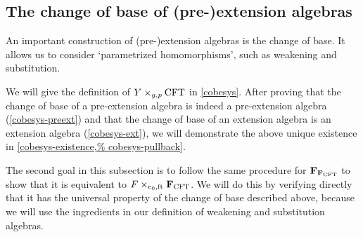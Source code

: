 \subsection{The change of base of (pre-)extension algebras}
\label{subsection:change_of_base}
An important construction of (pre-)extension algebras is the change of base. It
allows us to consider `parametrized homomorphisms', such as weakening and
substitution.

We will
give the definition of $\cobesys{Y}{\stesys}{g}{p}$ in \autoref{cobesys}. After
proving that the change of base of a pre-extension algebra is indeed a
pre-extension algebra (\autoref{cobesys-preext}) and that the change of base
of an extension algebra is an extension algebra (\autoref{cobesys-ext}), we
will demonstrate the above unique existence in \autoref{cobesys-existence,%
cobesys-pullback}.

The second goal in this subsection is to follow the same procedure for
$\mathbf{F}_{\mathbf{F}_{\mathrm{CFT}}}$ to show that it is equivalent to
$\cobesys{\stesysf}{\famesys{\stesys}}{\ectxext}{\eft}$. We will do this by
verifying directly that it has the universal property of the change of base
described above, because we will use the ingredients in our definition of
weakening and substitution algebras.

